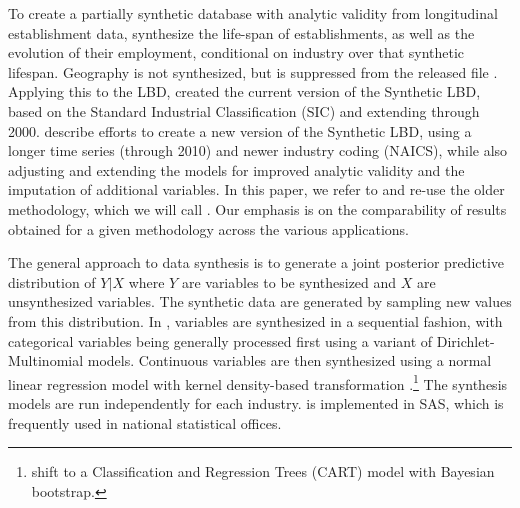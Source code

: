 

To create a partially synthetic database with analytic validity from longitudinal establishment data, \citet{RePEc:cen:tnotes:11-01} synthesize the life-span of establishments, as well as the evolution of their employment, conditional on industry over that synthetic lifespan. Geography is not synthesized, but is suppressed from the released file \citep{RePEc:cen:tnotes:11-01}. Applying this to the \ac{LBD}, \citet{KinneyEtAl2011}  created the current version of the Synthetic LBD,  based on the Standard Industrial Classification (SIC) and extending through 2000. \citet{RePEc:cen:wpaper:14-12} describe efforts to create a new version of the Synthetic LBD, using a longer time  series (through 2010) and newer industry coding (NAICS), while also adjusting and extending the models for  improved  analytic validity and  the imputation of additional variables. In this paper, we refer to and re-use the older methodology, which we will call \SynLBD. Our emphasis is on the comparability of results obtained for a given methodology across the various applications.
  

The general approach to data synthesis is to generate a joint posterior predictive distribution of $Y|X$ where $Y$ are variables to be synthesized and $X$ are unsynthesized variables. The synthetic data are generated by sampling new values from this distribution. In \SynLBD, variables are synthesized in a sequential fashion, with categorical variables being generally processed first using a variant of Dirichlet-Multinomial models. Continuous variables are then synthesized using a normal linear regression model with kernel density-based transformation \citep{WOODCOCK20094228}.\footnote{\textcite{RePEc:cen:wpaper:14-12} shift  to a Classification and Regression Trees (CART) model with Bayesian bootstrap. } The synthesis models are run independently for each industry. \SynLBD{} is implemented in SAS\texttrademark, which is frequently used in national statistical offices.

